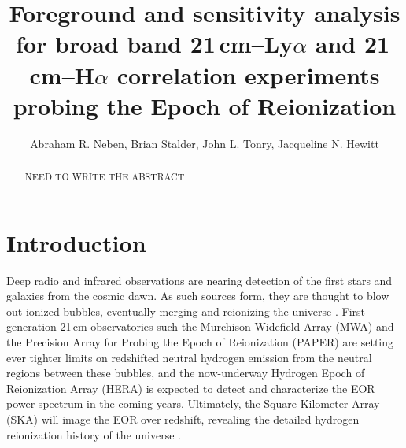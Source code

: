 \documentclass{emulateapj}
\begin{document}
\title{Foreground and sensitivity analysis for broad band 21\,cm--Ly$\alpha$ and 21\,cm--H$\alpha$ correlation experiments probing the Epoch of Reionization}


\author{Abraham R. Neben,
Brian Stalder,
John L. Tonry,
Jacqueline N. Hewitt}




\begin{abstract}
NEED TO WRITE THE ABSTRACT
\end{abstract}


\section{Introduction}

Deep radio and infrared observations are nearing detection of the first stars and galaxies from the cosmic dawn. As such sources form, they are thought to blow out ionized bubbles, eventually merging and reionizing the universe \citep{FurlanettoReview,miguelreview,PritchardLoebReview}. First generation 21\,cm observatories such the Murchison Widefield Array (MWA) \citep{tingay13,mwascience} and the Precision Array for Probing the Epoch of Reionization (PAPER) \citep{parsons14,ali15,PoberPAPER64Heating,DannyMultiRedshift} are setting ever tighter limits on redshifted neutral hydrogen emission from the neutral regions between these bubbles, and the now-underway Hydrogen Epoch of Reionization Array (HERA) \citep{deboer16} is expected to detect and characterize the EOR power spectrum in the coming years. Ultimately, the Square Kilometer Array (SKA) will image the EOR over redshift, revealing the detailed hydrogen reionization history of the universe \citep{ska}. 
\end{document}
